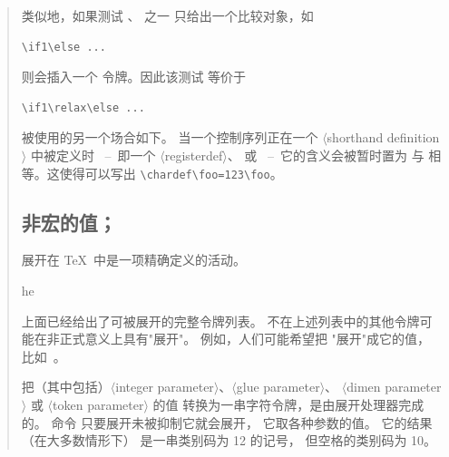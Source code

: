 \documentclass[a4paper]{rapport3}
\makeatletter
\def\gr#1{$\langle$#1$\rangle$}\def\key#1{{\tt#1}}
\def\ldash{\unskip\ --\nobreak\ \ignorespaces}
\def\rdash{\unskip\nobreak\ --\ \ignorespaces}
\newenvironment{disp}{\begin{quotation}}{\end{quotation}}
\def\cstoidx#1\par{\index{#1@\cs{#1}}}
\makeatother
\begin{document}
\begin{disp}
类似地，如果测试 、 之一
只给出一个比较对象，如 \begin{verbatim}
\if1\else ...
\end{verbatim}
则会插入一个  令牌。因此该测试
等价于 \begin{verbatim}
\if1\relax\else ...
\end{verbatim}

 被使用的另一个场合如下。
当一个控制序列正在一个 \gr{shorthand definition} 中被定义时
\ldash 即一个 \gr{registerdef}、
或  \rdash 它的含义会被暂时置为
与  相等。这使得可以写出
\verb>\chardef\foo=123\foo>。

\subsection{非宏的值；}

展开在 \TeX\ 中是一项精确定义的活动。
\cstoidx the\par
上面已经给出了可被展开的完整令牌列表。
不在上述列表中的其他令牌可能在非正式意义上具有"展开"。
例如，人们可能希望把 "展开"成它的值，比如~\n{20pt}。

把（其中包括）\gr{integer parameter}、\gr{glue parameter}、
\gr{dimen parameter} 或 \gr{token parameter} 的值
转换为一串字符令牌，是由展开处理器完成的。
命令 
只要展开未被抑制它就会展开，
它取各种参数的值。
它的结果（在大多数情形下）
是一串类别码为 12 的记号，
但空格的类别码为 10。


\end{disp}
\end{document}
